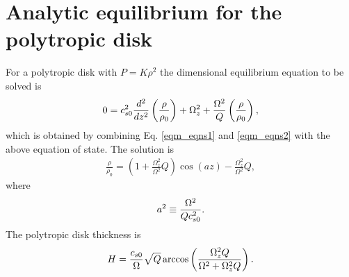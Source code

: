 \section{Analytic equilibrium for the polytropic disk}\label{appen1}
For a polytropic disk with $P = K\rho^2$ the dimensional equilibrium equation to
be solved is
\begin{align}
  0=c_{s0}^2\frac{d^2}{dz^2}\left(\frac{\rho}{\rho_0}\right) +
  \Omega_z^2 + \frac{\Omega^2}{Q}\left(\frac{\rho}{\rho_0}\right), 
\end{align}
which is obtained by combining Eq. \ref{eqm_eqns1} and
\ref{eqm_eqns2} with the above equation of state. The solution is
\begin{align}  
  \frac{\rho}{\rho_0} = \left(1 + \frac{\Omega_z^2}{\Omega^2}Q\right)\cos{\left(a z\right)} - 
\frac{\Omega_z^2}{\Omega^2}Q,  
\end{align}
where  
\begin{align}
  a^2 \equiv \frac{\Omega^2}{Qc_{s0}^2}. 
\end{align}
The polytropic disk thickness is
\begin{align}
  H =
  \frac{c_{s0}}{\Omega}\sqrt{Q}\arccos\left(\frac{\Omega_z^2Q}{\Omega^2+ \Omega_z^2Q}\right).  
\end{align}

